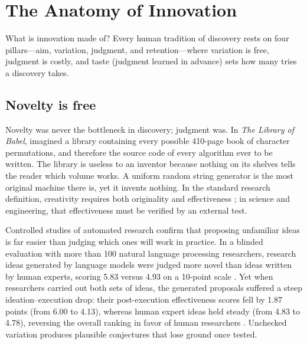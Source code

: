 
\section{The Anatomy of Innovation}\label{sec:anatomy}

What is innovation made of? Every human tradition of discovery rests on four pillars---aim, variation, judgment, and retention---where variation is free, judgment is costly, and taste (judgment learned in advance) sets how many tries a discovery takes.

\subsection{Novelty is free}\label{sub:anatomy-novelty}

Novelty was never the bottleneck in discovery; judgment was. In \emph{The Library of Babel}, \citet{borges1941babel} imagined a library containing every possible 410-page book of character permutations, and therefore the source code of every algorithm ever to be written. The library is useless to an inventor because nothing on its shelves tells the reader which volume works. A uniform random string generator is the most original machine there is, yet it invents nothing. In the standard research definition, creativity requires both originality and effectiveness \citep{runco2012standard}; in science and engineering, that effectiveness must be verified by an external test.

Controlled studies of automated research confirm that proposing unfamiliar ideas is far easier than judging which ones will work in practice. In a blinded evaluation with more than \num{100} natural language processing researchers, research ideas generated by language models were judged more novel than ideas written by human experts, scoring \num{5.83} versus \num{4.93} on a 10-point scale \citep{si2024ideas}. Yet when researchers carried out both sets of ideas, the generated proposals suffered a steep ideation--execution drop: their post-execution effectiveness scores fell by \num{1.87} points (from \num{6.00} to \num{4.13}), whereas human expert ideas held steady (from \num{4.83} to \num{4.78}), reversing the overall ranking in favor of human researchers \citep{si2025gap}. Unchecked variation produces plausible conjectures that lose ground once tested.

